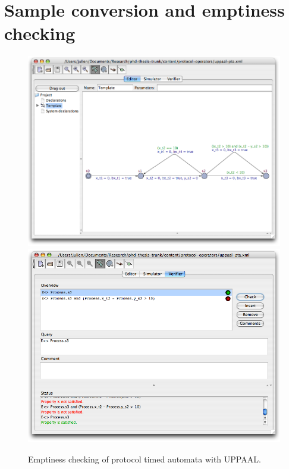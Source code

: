 
\section{Sample conversion and emptiness checking}


\begin{figure}[htbp]
  \includegraphics[width=\textwidth]{content/protocol-operators/uppaal-pta-1}
  \vspace{-0.5cm}
  \includegraphics[width=\textwidth]{content/protocol-operators/uppaal-pta-2}
  \caption{Emptiness checking of protocol timed automata with UPPAAL.}
  \label{fig:uppaal-pta}
\end{figure}

